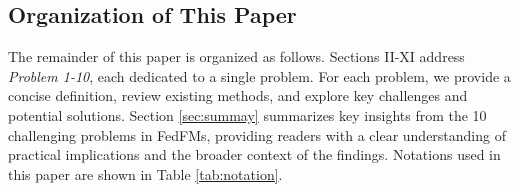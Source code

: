 \subsection{Organization of This Paper}

The remainder of this paper is organized as follows.
Sections II-XI address \textit{Problem 1-10}, each dedicated to a single problem. For each problem, we provide a concise definition, review existing methods, and explore key challenges and potential solutions.
Section \ref{sec:summay} summarizes key insights from the 10 challenging problems in FedFMs, providing readers with a clear understanding of practical implications and the broader context of the findings. Notations used in this paper are shown in Table \ref{tab:notation}.



\begin{table*}[htbp]
\setlength\tabcolsep{0.6pt}
\caption{Comparison of Existing Reviews and Position Papers with This Survey Paper}
\label{tab:existingreview}
\centering
{}
\end{table*}
